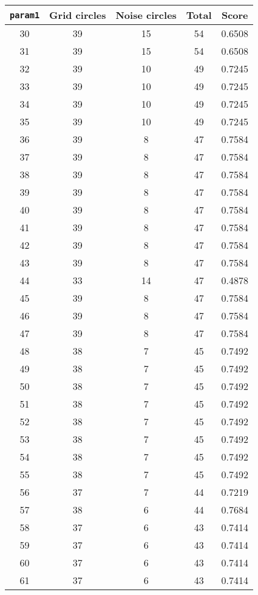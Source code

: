 \documentclass[letterpaper, 12pt]{article}
\begin{document}
\begin{longtable}{|c|c|c|c|c|}
\hline
\textbf{\texttt{param1}} & \textbf{Grid circles} & \textbf{Noise circles} & \textbf{Total} & \textbf{Score} \\
\hline
30 & 39 & 15 & 54 & 0.6508 \\
\hline
31 & 39 & 15 & 54 & 0.6508 \\
\hline
32 & 39 & 10 & 49 & 0.7245 \\
\hline
33 & 39 & 10 & 49 & 0.7245 \\
\hline
34 & 39 & 10 & 49 & 0.7245 \\
\hline
35 & 39 & 10 & 49 & 0.7245 \\
\hline
36 & 39 & 8 & 47 & 0.7584 \\
\hline
37 & 39 & 8 & 47 & 0.7584 \\
\hline
38 & 39 & 8 & 47 & 0.7584 \\
\hline
39 & 39 & 8 & 47 & 0.7584 \\
\hline
40 & 39 & 8 & 47 & 0.7584 \\
\hline
41 & 39 & 8 & 47 & 0.7584 \\
\hline
42 & 39 & 8 & 47 & 0.7584 \\
\hline
43 & 39 & 8 & 47 & 0.7584 \\
\hline
44 & 33 & 14 & 47 & 0.4878 \\
\hline
45 & 39 & 8 & 47 & 0.7584 \\
\hline
46 & 39 & 8 & 47 & 0.7584 \\
\hline
47 & 39 & 8 & 47 & 0.7584 \\
\hline
48 & 38 & 7 & 45 & 0.7492 \\
\hline
49 & 38 & 7 & 45 & 0.7492 \\
\hline
50 & 38 & 7 & 45 & 0.7492 \\
\hline
51 & 38 & 7 & 45 & 0.7492 \\
\hline
52 & 38 & 7 & 45 & 0.7492 \\
\hline
53 & 38 & 7 & 45 & 0.7492 \\
\hline
54 & 38 & 7 & 45 & 0.7492 \\
\hline
55 & 38 & 7 & 45 & 0.7492 \\
\hline
56 & 37 & 7 & 44 & 0.7219 \\
\hline
57 & 38 & 6 & 44 & 0.7684 \\
\hline
58 & 37 & 6 & 43 & 0.7414 \\
\hline
59 & 37 & 6 & 43 & 0.7414 \\
\hline
60 & 37 & 6 & 43 & 0.7414 \\
\hline
61 & 37 & 6 & 43 & 0.7414 \\

\end{longtable}
\end{document}
